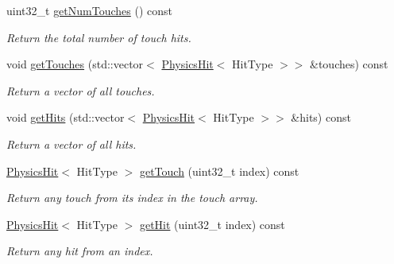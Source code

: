 \begin{DoxyCompactItemize}
\mbox{\label{classrev_1_1_physics_hits_aeb626da8bf23b148c12dacb17b03be8e}} 
uint32\+\_\+t \mbox{\hyperlink{classrev_1_1_physics_hits_aeb626da8bf23b148c12dacb17b03be8e}{get\+Num\+Touches}} () const
\begin{DoxyCompactList}\small\item\em Return the total number of touch hits. \end{DoxyCompactList}\item 
\mbox{\label{classrev_1_1_physics_hits_a995d555e702fe36bde839ca88b46698f}} 
void \mbox{\hyperlink{classrev_1_1_physics_hits_a995d555e702fe36bde839ca88b46698f}{get\+Touches}} (std\+::vector$<$ \mbox{\hyperlink{classrev_1_1_physics_hit}{Physics\+Hit}}$<$ Hit\+Type $>$$>$ \&touches) const
\begin{DoxyCompactList}\small\item\em Return a vector of all touches. \end{DoxyCompactList}\item 
\mbox{\label{classrev_1_1_physics_hits_a381bf9119fe38e386ed970b020943cfd}} 
void \mbox{\hyperlink{classrev_1_1_physics_hits_a381bf9119fe38e386ed970b020943cfd}{get\+Hits}} (std\+::vector$<$ \mbox{\hyperlink{classrev_1_1_physics_hit}{Physics\+Hit}}$<$ Hit\+Type $>$$>$ \&hits) const
\begin{DoxyCompactList}\small\item\em Return a vector of all hits. \end{DoxyCompactList}\item 
\mbox{\label{classrev_1_1_physics_hits_a73ac6130e502a2d3eb51477d35dc2e37}} 
\mbox{\hyperlink{classrev_1_1_physics_hit}{Physics\+Hit}}$<$ Hit\+Type $>$ \mbox{\hyperlink{classrev_1_1_physics_hits_a73ac6130e502a2d3eb51477d35dc2e37}{get\+Touch}} (uint32\+\_\+t index) const
\begin{DoxyCompactList}\small\item\em Return any touch from its index in the touch array. \end{DoxyCompactList}\item 
\mbox{\label{classrev_1_1_physics_hits_a5859cd857de3862ede3dff512e614f8a}} 
\mbox{\hyperlink{classrev_1_1_physics_hit}{Physics\+Hit}}$<$ Hit\+Type $>$ \mbox{\hyperlink{classrev_1_1_physics_hits_a5859cd857de3862ede3dff512e614f8a}{get\+Hit}} (uint32\+\_\+t index) const
\begin{DoxyCompactList}\small\item\em Return any hit from an index. \end{DoxyCompactList}\end{DoxyCompactItemize}

